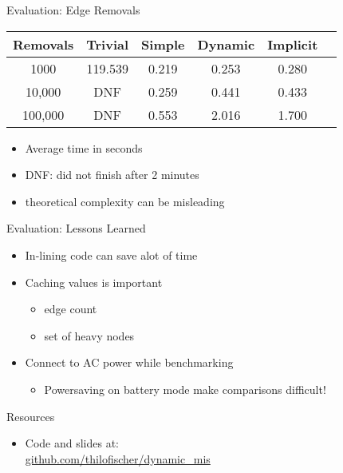 \documentclass{beamer}
\begin{document}
\begin{frame}{Evaluation: Edge Removals}
  \begin{table}[]
  \begin{tabular}{|c|c|c|c|c|c|}
    \hline
    Removals & Trivial & Simple & Dynamic & Implicit \\
    \hline
    \hline
    1000 & 119.539 & 0.219 & 0.253 & 0.280 \\ %
    \hline
    10,000 & DNF & 0.259 & 0.441 & 0.433 \\
    \hline
    100,000 & DNF & 0.553 & 2.016 & 1.700 \\
    \hline
  \end{tabular}
  \end{table}
  \begin{itemize}
    \item Average time in seconds
    \item DNF: did not finish after 2 minutes
    \item theoretical complexity can be misleading 
  \end{itemize}
\end{frame}

\begin{frame}{Evaluation: Lessons Learned}
  \begin{itemize}
    \item In-lining code can save alot of time
    \item Caching values is important
      \begin{itemize}
        \item edge count
        \item set of heavy nodes
      \end{itemize}
    \item Connect to AC power while benchmarking
      \begin{itemize}
        \item Powersaving on battery mode make comparisons difficult!
      \end{itemize}
  \end{itemize}
\end{frame}

\begin{frame}{Resources}
  \begin{itemize}
    \item Code and slides at: \\
          \href{https://www.github.com/thilofischer/dynamic_mis}{github.com/thilofischer/dynamic\_mis}
  \end{itemize}
\end{frame}
\end{document}
